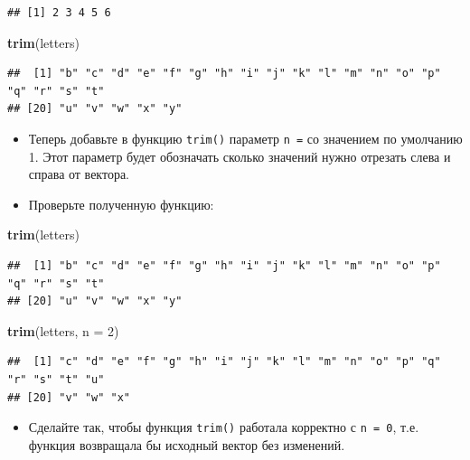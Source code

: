 \documentclass[]{book}
\newenvironment{Shaded}{\begin{snugshade}}{\end{snugshade}}
\newcommand{\KeywordTok}[1]{\textcolor[rgb]{0.13,0.29,0.53}{\textbf{#1}}}
\newcommand{\DataTypeTok}[1]{\textcolor[rgb]{0.13,0.29,0.53}{#1}}
\newcommand{\DecValTok}[1]{\textcolor[rgb]{0.00,0.00,0.81}{#1}}
\newcommand{\NormalTok}[1]{#1}
\providecommand{\tightlist}{%
  \setlength{\itemsep}{0pt}\setlength{\parskip}{0pt}}
\begin{document}
\begin{verbatim}
## [1] 2 3 4 5 6
\end{verbatim}

\begin{Shaded}
\begin{Highlighting}[]
\KeywordTok{trim}\NormalTok{(letters)}
\end{Highlighting}
\end{Shaded}

\begin{verbatim}
##  [1] "b" "c" "d" "e" "f" "g" "h" "i" "j" "k" "l" "m" "n" "o" "p" "q" "r" "s" "t"
## [20] "u" "v" "w" "x" "y"
\end{verbatim}

\begin{itemize}
\item
  Теперь добавьте в функцию \texttt{trim()} параметр \texttt{n\ =} со
  значением по умолчанию 1. Этот параметр будет обозначать сколько
  значений нужно отрезать слева и справа от вектора.
\item
  Проверьте полученную функцию:
\end{itemize}

\begin{Shaded}
\begin{Highlighting}[]
\KeywordTok{trim}\NormalTok{(letters)}
\end{Highlighting}
\end{Shaded}

\begin{verbatim}
##  [1] "b" "c" "d" "e" "f" "g" "h" "i" "j" "k" "l" "m" "n" "o" "p" "q" "r" "s" "t"
## [20] "u" "v" "w" "x" "y"
\end{verbatim}

\begin{Shaded}
\begin{Highlighting}[]
\KeywordTok{trim}\NormalTok{(letters, }\DataTypeTok{n =} \DecValTok{2}\NormalTok{)}
\end{Highlighting}
\end{Shaded}

\begin{verbatim}
##  [1] "c" "d" "e" "f" "g" "h" "i" "j" "k" "l" "m" "n" "o" "p" "q" "r" "s" "t" "u"
## [20] "v" "w" "x"
\end{verbatim}

\begin{itemize}
\tightlist
\item
  Сделайте так, чтобы функция \texttt{trim()} работала корректно с
  \texttt{n\ =\ 0}, т.е. функция возвращала бы исходный вектор без
  изменений.
\end{itemize}
\end{document}
